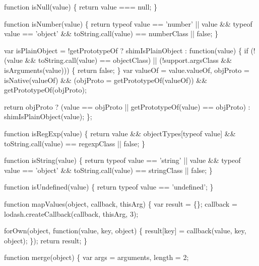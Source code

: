 \begin{DoxyCodeInclude}
    \textcolor{keyword}{function} isNull(value) \{
      \textcolor{keywordflow}{return} value === null;
    \}

    \textcolor{keyword}{function} isNumber(value) \{
      \textcolor{keywordflow}{return} typeof value == \textcolor{stringliteral}{'number'} ||
        value && typeof value == \textcolor{stringliteral}{'object'} && toString.call(value) == numberClass || \textcolor{keyword}{false};
    \}

    var isPlainObject = !getPrototypeOf ? shimIsPlainObject : \textcolor{keyword}{function}(value) \{
      \textcolor{keywordflow}{if} (!(value && toString.call(value) == objectClass) || (!support.argsClass && isArguments(value))) \{
        \textcolor{keywordflow}{return} \textcolor{keyword}{false};
      \}
      var valueOf = value.valueOf,
          objProto = isNative(valueOf) && (objProto = getPrototypeOf(valueOf)) && getPrototypeOf(objProto);

      \textcolor{keywordflow}{return} objProto
        ? (value == objProto || getPrototypeOf(value) == objProto)
        : shimIsPlainObject(value);
    \};

    \textcolor{keyword}{function} isRegExp(value) \{
      \textcolor{keywordflow}{return} value && objectTypes[typeof value] && toString.call(value) == regexpClass || \textcolor{keyword}{false};
    \}

    \textcolor{keyword}{function} isString(value) \{
      \textcolor{keywordflow}{return} typeof value == \textcolor{stringliteral}{'string'} ||
        value && typeof value == \textcolor{stringliteral}{'object'} && toString.call(value) == stringClass || \textcolor{keyword}{false};
    \}

    \textcolor{keyword}{function} isUndefined(value) \{
      \textcolor{keywordflow}{return} typeof value == \textcolor{stringliteral}{'undefined'};
    \}

    \textcolor{keyword}{function} mapValues(\textcolor{keywordtype}{object}, callback, thisArg) \{
      var result = \{\};
      callback = lodash.createCallback(callback, thisArg, 3);

      forOwn(\textcolor{keywordtype}{object}, \textcolor{keyword}{function}(value, key, \textcolor{keywordtype}{object}) \{
        result[key] = callback(value, key, \textcolor{keywordtype}{object});
      \});
      \textcolor{keywordflow}{return} result;
    \}

    \textcolor{keyword}{function} merge(\textcolor{keywordtype}{object}) \{
      var args = arguments,
          length = 2;


\end{DoxyCodeInclude}
